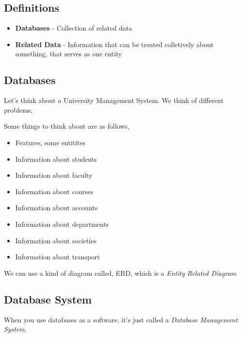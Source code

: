 \documentclass{article}
\begin{document}
    \subsection{Definitions}

    \begin{itemize}
        \item \label{databases}{\textbf{Databases}} - Collection of related data
        \item \textbf{Related Data} - Information that can be treated colletively about something, that serves as one entity
    \end{itemize}

    \subsection{Databases}

    Let's think about a University Management System. 
    We think of different problems,


    Some things to think about are as follows, 

    \begin{itemize}
        \item Features, some entitites
        \item Information about students
        \item Information about faculty
        \item Information about courses
        \item Information about accounts
        \item Information about departments
        \item Information about societies
        \item Information about transport
    \end{itemize}

    We can use a kind of diagram called, ERD, which is a \emph{Entity Related Diagram}

    \subsection{Database System}

    When you use databases as a software, it's just called a \textit{Database Management System}.
\end{document}
